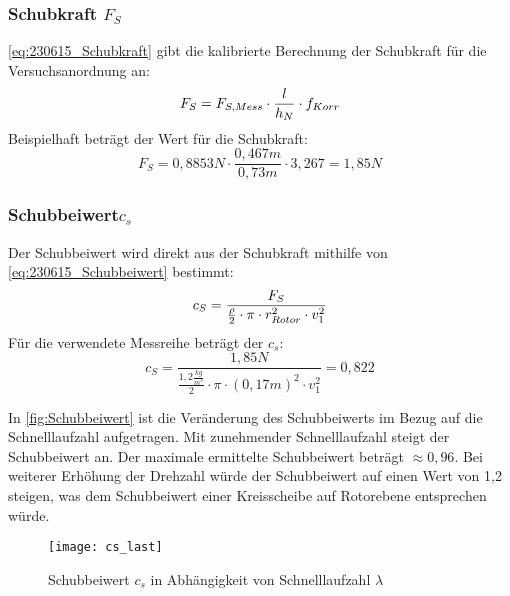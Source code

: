 \subsubsection*{Schubkraft $F_S$}
\autoref{eq:230615_Schubkraft} gibt die kalibrierte Berechnung der Schubkraft für die Versuchsanordnung an:
\begin{equation}
    \centering
    F_S = F_{S,Mess} \cdot \frac{l}{h_N} \cdot f_{Korr}
    \label{eq:230615_Schubkraft}
\end{equation}
Beispielhaft beträgt der Wert für die Schubkraft:
$$F_S = 0,8853N \cdot \frac{0,467m}{0,73m} \cdot 3,267 = 1,85N$$
\subsubsection*{Schubbeiwert$c_s$}
Der Schubbeiwert wird direkt aus der Schubkraft mithilfe von \autoref{eq:230615_Schubbeiwert} bestimmt:
\begin{equation}
    \centering
    c_S = \frac{F_S}{\frac{\rho}{2} \cdot \pi \cdot r_{Rotor}^2 \cdot v_1^2}
    \label{eq:230615_Schubbeiwert}
\end{equation}
Für die verwendete Messreihe beträgt der $c_s$:
$$c_S = \frac{1,85N}{\frac{1,2 \frac{kg}{m^3}}{2} \cdot \pi \cdot (0,17 m)^2 \cdot v_1^2} = 0,822$$

In \autoref{fig:Schubbeiwert} ist die Veränderung des Schubbeiwerts im Bezug auf die Schnelllaufzahl aufgetragen.
Mit zunehmender Schnelllaufzahl steigt der Schubbeiwert an. Der maximale ermittelte Schubbeiwert beträgt $\approx 0,96$. Bei weiterer Erhöhung der Drehzahl würde der Schubbeiwert auf einen Wert von 1,2 steigen, was dem Schubbeiwert einer Kreisscheibe auf Rotorebene entsprechen würde.
\begin{figure}[H]
    \centering
    \texttt{[image: cs\_last]}
    \caption{Schubbeiwert $c_s$ in Abhängigkeit von Schnelllaufzahl $\lambda$}
    \label{fig:Schubbeiwert}
\end{figure}


